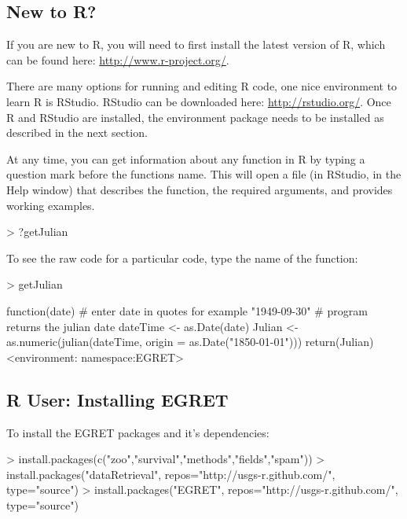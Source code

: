 \documentclass[a4paper,11pt]{article}
\begin{document}
\subsection{New to R?}
If you are new to R, you will need to first install the latest version of R, which can be found here: \url{http://www.r-project.org/}.

There are many options for running and editing R code, one nice environment to learn R is RStudio. RStudio can be downloaded here: \url{http://rstudio.org/}. Once R and RStudio are installed, the environment package needs to be installed as described in the next section.

At any time, you can get information about any function in R by typing a question mark before the functions name.  This will open a file (in RStudio, in the Help window) that describes the function, the required arguments, and provides working examples.

\begin{Schunk}
\begin{Sinput}
> ?getJulian
\end{Sinput}
\end{Schunk}

To see the raw code for a particular code, type the name of the function:
\begin{Schunk}
\begin{Sinput}
> getJulian
\end{Sinput}
\begin{Soutput}
function(date) {
  # enter date in quotes for example "1949-09-30" 
  # program returns the julian date  
  dateTime <- as.Date(date)
  Julian <- as.numeric(julian(dateTime, origin = as.Date("1850-01-01")))
  return(Julian)
}
<environment: namespace:EGRET>
\end{Soutput}
\end{Schunk}


\subsection{R User: Installing EGRET}
To install the EGRET packages and it's dependencies:

\begin{Schunk}
\begin{Sinput}
> install.packages(c("zoo","survival","methods","fields","spam"))
> install.packages("dataRetrieval", repos="http://usgs-r.github.com/", 
                  type="source")
> install.packages("EGRET", repos="http://usgs-r.github.com/", 
                  type="source")
\end{Sinput}
\end{Schunk}
\end{document}
